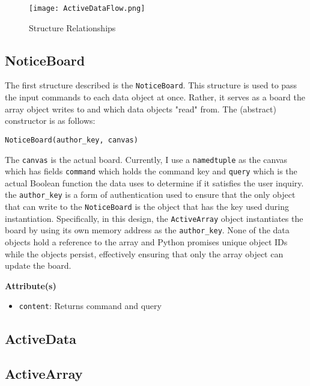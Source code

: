 \documentclass[10pt]{article}
\begin{document}
	\begin{figure}[htbp]
		\centering
		\texttt{[image: ActiveDataFlow.png]}
		\caption{Structure Relationships}
		\label{fig:relationships}
	\end{figure}

\subsection{NoticeBoard}
	The first structure described is the \lstinline|NoticeBoard|. This structure is used to pass the input commands to each data object at once. Rather, it serves as a board the array object writes to and which data objects "read" from. 
	The (abstract) constructor is as follows:
	
\begin{lstlisting}
NoticeBoard(author_key, canvas)
\end{lstlisting}
	
	The \lstinline|canvas| is the actual board. Currently, I use a \lstinline|namedtuple| as the canvas which has fields \lstinline|command| which holds the command key and \lstinline|query| which is the actual Boolean function the data uses to determine if it satisfies the user inquiry. the \lstinline|author_key| is a form of authentication used to ensure that the only object that can write to the \lstinline|NoticeBoard| is the object that has the key used during instantiation. Specifically, in this design, the \lstinline|ActiveArray| object instantiates the board by using its own memory address as the \lstinline|author_key|. None of the data objects hold a reference to the array and Python promises unique object IDs while the objects persist, effectively ensuring that only the array object can update the board.
	
	\noindent\textbf{Attribute(s)}
	\begin{itemize}
		\item \lstinline|content|: Returns command and query
	\end{itemize}
	
	
\subsection{ActiveData}
\subsection{ActiveArray}
	
\end{document}
